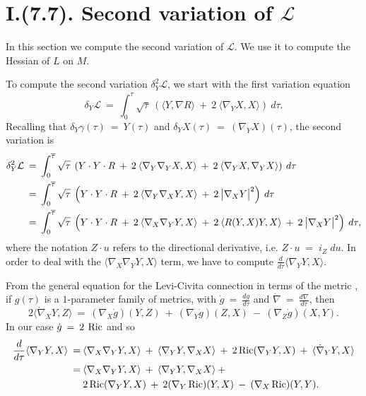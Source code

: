 \section{I.(7.7). Second variation of ${\mathcal L}$}


In this section we compute the second variation of ${\mathcal L}$.
We use it to compute the Hessian of $L$ on $M$.


To compute the second variation $\delta_Y^2 {\mathcal L}$, we start with
the first variation equation
\begin{equation}
\delta_Y {\mathcal L} \: = \:
\int_{0}^{\overline{\tau}} \sqrt{\tau} \: \left( \langle Y, \nabla R \rangle
\: + \: 2 \: \langle \nabla_Y X, X \rangle \right) \: d\tau.
\end{equation}
Recalling that $\delta_Y \gamma(\tau) \: =\: Y(\tau)$ and
$\delta_Y X(\tau) \: = \: (\nabla_Y X)(\tau)$,
the second variation is
\begin{align}
\delta_Y^2 {\mathcal L} \: & = \:
\int_{0}^{\overline{\tau}} \sqrt{\tau} \: \left( Y \cdot Y \cdot R
\: + \: 2 \: \langle \nabla_Y \nabla_Y X, X \rangle
\: + \: 2 \: \langle \nabla_Y X, \nabla_Y X \rangle \right) \: d\tau \\
& = \:
\int_{0}^{\overline{\tau}} \sqrt{\tau} \: \left( Y \cdot Y \cdot R
\: + \: 2 \: \langle \nabla_Y \nabla_X Y, X \rangle
\: + \: 2 \: \big| \nabla_X Y \big|^2 \right) \: d\tau \notag \\
& = \:
\int_{0}^{\overline{\tau}} \sqrt{\tau} \: \left( Y \cdot Y \cdot R
\: + \: 2 \: \langle \nabla_X \nabla_Y Y, X \rangle
\: + \: 2 \: \langle R(Y, X) Y, X \rangle
\: + \: 2 \: \big| \nabla_X Y \big|^2 \right) \: d\tau, \notag
\end{align}
where the notation $Z \cdot u$ refers to the directional derivative, i.e.
$Z\cdot u\;=\; i_Z\;du$.
In order to deal with the $\langle \nabla_X \nabla_Y Y, X \rangle$ term,
we have to compute $\frac{d}{d\tau} \langle \nabla_Y Y, X \rangle$.

From the general equation for the Levi-Civita
connection in terms of the metric
\cite[(1.29)]{Chavel}, if $g(\tau)$ is a $1$-parameter family of metrics,
with $\dot{g} \: = \: \frac{dg}{d\tau}$
and $\dot{\nabla} \: = \: \frac{d\nabla}{d\tau}$, then
\begin{equation}
2 \langle \dot{\nabla}_X Y, Z \rangle \: = \:
(\nabla_X \dot{g}) (Y, Z) \: + \:
(\nabla_Y \dot{g}) (Z, X) \: - \:
(\nabla_Z \dot{g}) (X, Y).
\end{equation}
In our case $\dot{g} \: = \: 2 \: \operatorname{Ric}$ and so
\begin{align} \label{xxx}
\frac{d}{d\tau} \langle \nabla_Y Y, X \rangle \: = \: &
\langle \nabla_X \nabla_Y Y, X \rangle \: + \:
\langle \nabla_Y Y, \nabla_X X \rangle \: + \:
2 \operatorname{Ric} ( \nabla_Y Y, X ) \: + \:
\langle \dot{\nabla}_Y Y, X \rangle \\
 = \: &
\langle \nabla_X \nabla_Y Y, X \rangle \: + \:
\langle \nabla_Y Y, \nabla_X X \rangle \: + \notag \\
& 2 \operatorname{Ric} ( \nabla_Y Y, X ) \: + \:
2 (\nabla_Y \operatorname{Ric}) (Y, X) \: - \:
(\nabla_X \operatorname{Ric}) (Y, Y). \notag
\end{align}

